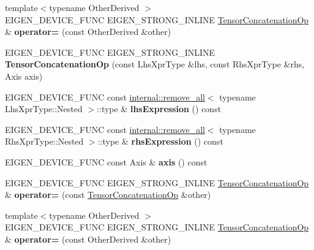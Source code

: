 \begin{DoxyCompactItemize}
{\footnotesize template$<$typename Other\+Derived $>$ }\\E\+I\+G\+E\+N\+\_\+\+D\+E\+V\+I\+C\+E\+\_\+\+F\+U\+NC E\+I\+G\+E\+N\+\_\+\+S\+T\+R\+O\+N\+G\+\_\+\+I\+N\+L\+I\+NE \hyperlink{class_eigen_1_1_tensor_concatenation_op}{Tensor\+Concatenation\+Op} \& {\bfseries operator=} (const Other\+Derived \&other)
\item 
\mbox{\label{class_eigen_1_1_tensor_concatenation_op_a5cc21137208c46e256726330bbc534cb}} 
E\+I\+G\+E\+N\+\_\+\+D\+E\+V\+I\+C\+E\+\_\+\+F\+U\+NC E\+I\+G\+E\+N\+\_\+\+S\+T\+R\+O\+N\+G\+\_\+\+I\+N\+L\+I\+NE {\bfseries Tensor\+Concatenation\+Op} (const Lhs\+Xpr\+Type \&lhs, const Rhs\+Xpr\+Type \&rhs, Axis axis)
\item 
\mbox{\label{class_eigen_1_1_tensor_concatenation_op_afba25c364c44056d16b52470b273098a}} 
E\+I\+G\+E\+N\+\_\+\+D\+E\+V\+I\+C\+E\+\_\+\+F\+U\+NC const \hyperlink{struct_eigen_1_1internal_1_1remove__all}{internal\+::remove\+\_\+all}$<$ typename Lhs\+Xpr\+Type\+::\+Nested $>$\+::type \& {\bfseries lhs\+Expression} () const
\item 
\mbox{\label{class_eigen_1_1_tensor_concatenation_op_ae500a14d17e34549a3164df6f0eb7038}} 
E\+I\+G\+E\+N\+\_\+\+D\+E\+V\+I\+C\+E\+\_\+\+F\+U\+NC const \hyperlink{struct_eigen_1_1internal_1_1remove__all}{internal\+::remove\+\_\+all}$<$ typename Rhs\+Xpr\+Type\+::\+Nested $>$\+::type \& {\bfseries rhs\+Expression} () const
\item 
\mbox{\label{class_eigen_1_1_tensor_concatenation_op_a09ce4fcc4a385d0bc59cf4172f96dcbe}} 
E\+I\+G\+E\+N\+\_\+\+D\+E\+V\+I\+C\+E\+\_\+\+F\+U\+NC const Axis \& {\bfseries axis} () const
\item 
\mbox{\label{class_eigen_1_1_tensor_concatenation_op_a710e8f1a467787ede3f88ace80eff45a}} 
E\+I\+G\+E\+N\+\_\+\+D\+E\+V\+I\+C\+E\+\_\+\+F\+U\+NC E\+I\+G\+E\+N\+\_\+\+S\+T\+R\+O\+N\+G\+\_\+\+I\+N\+L\+I\+NE \hyperlink{class_eigen_1_1_tensor_concatenation_op}{Tensor\+Concatenation\+Op} \& {\bfseries operator=} (const \hyperlink{class_eigen_1_1_tensor_concatenation_op}{Tensor\+Concatenation\+Op} \&other)
\item 
\mbox{\label{class_eigen_1_1_tensor_concatenation_op_a6abf89d1db219401bd0929105bb707c3}} 
{\footnotesize template$<$typename Other\+Derived $>$ }\\E\+I\+G\+E\+N\+\_\+\+D\+E\+V\+I\+C\+E\+\_\+\+F\+U\+NC E\+I\+G\+E\+N\+\_\+\+S\+T\+R\+O\+N\+G\+\_\+\+I\+N\+L\+I\+NE \hyperlink{class_eigen_1_1_tensor_concatenation_op}{Tensor\+Concatenation\+Op} \& {\bfseries operator=} (const Other\+Derived \&other)
\end{DoxyCompactItemize}
